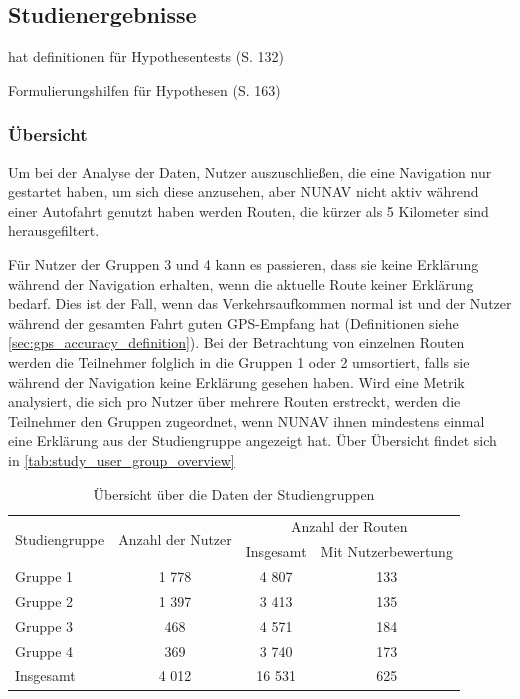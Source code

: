 \subsection{Studienergebnisse}
\label{sec:study_results_quantitativ}


\cite{wohlin2012experimentation} hat definitionen für Hypothesentests (S. 132)

\cite{wohlin2012experimentation} Formulierungshilfen für Hypothesen (S. 163)

\subsubsection{Übersicht}

Um bei der Analyse der Daten, Nutzer auszuschließen, die eine Navigation nur gestartet haben, um sich diese anzusehen, aber NUNAV nicht aktiv während einer Autofahrt genutzt haben werden Routen, die kürzer als 5 Kilometer sind herausgefiltert. 

Für Nutzer der Gruppen 3 und 4 kann es passieren, dass sie keine Erklärung während der Navigation erhalten, wenn die aktuelle Route keiner Erklärung bedarf. Dies ist der Fall, wenn das Verkehrsaufkommen \glqq normal\grqq{} ist und der Nutzer während der gesamten Fahrt guten GPS-Empfang hat (Definitionen siehe \autoref{sec:gps_accuracy_definition}). Bei der Betrachtung von einzelnen Routen werden die Teilnehmer folglich in die Gruppen 1 oder 2 umsortiert, falls sie während der Navigation keine Erklärung gesehen haben. Wird eine Metrik analysiert, die sich pro Nutzer über mehrere Routen erstreckt, werden die Teilnehmer den Gruppen zugeordnet, wenn NUNAV ihnen mindestens einmal eine Erklärung aus der Studiengruppe angezeigt hat. Über Übersicht findet sich in \autoref{tab:study_user_group_overview}

\begin{table}
    \centering
    \begin{tabular}{p{} c c c}
        \hline
        \multirow{2}{*}{Studiengruppe} & \multirow{2}{*}{Anzahl der Nutzer} & \multicolumn{2}{c}{Anzahl der Routen} \\
        & & Insgesamt & Mit Nutzerbewertung \\
        \toprule
        Gruppe 1            & 1 778  & 4 807  & 133 \\
        Gruppe 2            & 1 397  & 3 413  & 135 \\
        Gruppe 3            & 468   & 4 571  & 184 \\
        Gruppe 4            & 369   & 3 740  & 173 \\
        \midrule
        Insgesamt  & 4 012  & 16 531 & 625 \\ 
        \toprule
    \end{tabular}
    \caption{Übersicht über die Daten der Studiengruppen}
    \label{tab:study_user_group_overview}
\end{table}

